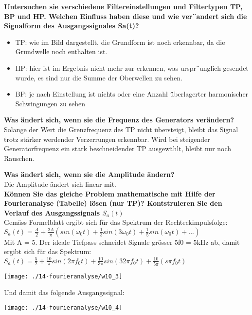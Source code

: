 \textbf{Untersuchen sie verschiedene Filtereinstellungen und Filtertypen TP, BP und HP. Welchen Einfluss haben diese und wie ver¨andert sich die Signalform des Ausgangssignales Sa(t)?}\\
\begin{itemize}
    \item TP: wie im Bild dargestellt, die Grundform ist noch erkennbar, da die Grundwelle noch enthalten ist.
    \item HP: hier ist im Ergebnis nicht mehr zur erkennen, was urspr¨unglich gesendet wurde, es sind nur die Summe der Oberwellen zu sehen.
    \item BP: je nach Einstellung ist nichts oder eine Anzahl überlagerter harmonischer Schwingungen zu sehen\\
\end{itemize}

\textbf{Was ändert sich, wenn sie die Frequenz des Generators verändern?}\\
Solange der Wert die Grenzfrequenz des TP nicht übersteigt, bleibt das Signal trotz stärker werdender Verzerrungen erkennbar. Wird bei steigender Generatorfrequenz ein stark beschneidender TP ausgewählt, bleibt nur noch
Rauschen.

\textbf{Was ändert sich, wenn sie die Amplitude ändern?}\\
Die Amplitude ändert sich linear mit.\\

\textbf{Können Sie das gleiche Problem mathematische mit Hilfe der Fourieranalyse (Tabelle) lösen (nur TP)?
Kontstruieren Sie den Verlauf des Ausgangssignals $S_a(t)$}\\
Gemäss Formelblatt ergibt sich für das Spektrum der Rechteckimpulsfolge:\\
$S_a(t)=\frac{A}{2}+\frac{2A}{\pi}(sin(\omega_0t)+\frac{1}{3}sin(3\omega_0t)+\frac{1}{5}sin(\omega_0t)+...)$\\
Mit A = 5. Der ideale Tiefpass schneidet Signale grösser 5f0 = 5kHz ab, damit ergibt sich für das Spektrum:\\
$S_a(t)=\frac{5}{2}+\frac{10}{\pi}sin(2\pi f_0t)+\frac{10}{3\pi}sin(32\pi f_0t)+\frac{10}{5\pi}(s\pi f_0t)$\\
\begin{center}
    \vspace{-8pt}
    \texttt{[image: ./14-fourieranalyse/w10\_3]}
    \vspace{-8pt}
\end{center}

Und damit das folgende Ausgangssignal:
\begin{center}
    \vspace{-8pt}
    \texttt{[image: ./14-fourieranalyse/w10\_4]}
    \vspace{-8pt}
\end{center}